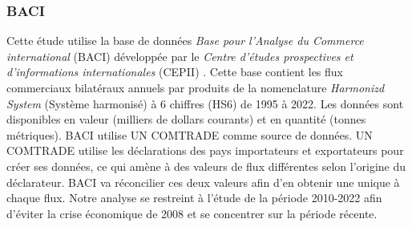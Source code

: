 \documentclass[french,10pt,a4paper]{article}
\begin{document}
\subsubsection{BACI}
Cette étude utilise la base de données \textit{Base pour l'Analyse du Commerce international} (BACI) développée par le \textit{Centre d'études prospectives et d'informations internationales} (CEPII) \citep{Gaulier2010}. Cette base contient les flux commerciaux bilatéraux annuels par produits de la nomenclature \textit{Harmonizd System} (Système harmonisé) à 6 chiffres (HS6) de 1995 à 2022. Les données sont disponibles en valeur (milliers de dollars courants) et en quantité (tonnes métriques). BACI utilise UN COMTRADE comme source de données. UN COMTRADE utilise les déclarations des pays importateurs et exportateurs pour créer ses données, ce qui amène à des valeurs de flux différentes selon l'origine du déclarateur. BACI va réconcilier ces deux valeurs afin d'en obtenir une unique à chaque flux. Notre analyse se restreint à l'étude de la période 2010-2022 afin d'éviter la crise économique de 2008 et se concentrer sur la période récente.
\end{document}
